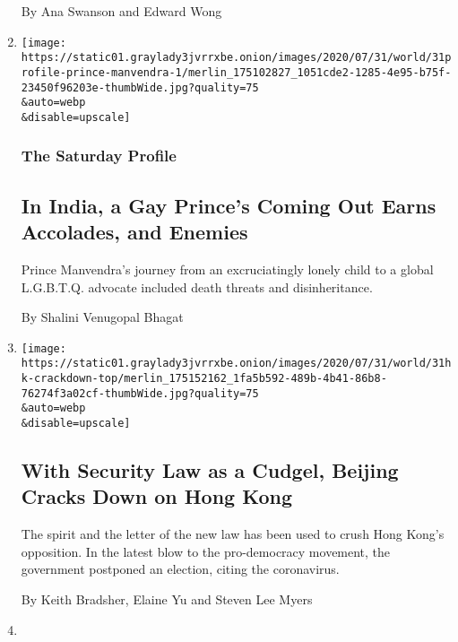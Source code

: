 \begin{enumerate}
  By Ana Swanson and Edward Wong
\item
  \href{/2020/07/31/world/asia/india-prince-manvendra-gay-rights.html}{}

  \texttt{[image: https://static01.graylady3jvrrxbe.onion/images/2020/07/31/world/31profile-prince-manvendra-1/merlin\_175102827\_1051cde2-1285-4e95-b75f-23450f96203e-thumbWide.jpg?quality=75\\\&auto=webp\\\&disable=upscale]}

  \hypertarget{the-saturday-profile}{%
  \subsubsection{The Saturday Profile}\label{the-saturday-profile}}

  \hypertarget{in-india-a-gay-princes-coming-out-earns-accolades-and-enemies}{%
  \subsection{In India, a Gay Prince's Coming Out Earns Accolades, and
  Enemies}\label{in-india-a-gay-princes-coming-out-earns-accolades-and-enemies}}

  Prince Manvendra's journey from an excruciatingly lonely child to a
  global L.G.B.T.Q. advocate included death threats and disinheritance.

  By Shalini Venugopal Bhagat
\item
  \href{/2020/07/31/world/asia/hong-kong-election-national-security-law.html}{}

  \texttt{[image: https://static01.graylady3jvrrxbe.onion/images/2020/07/31/world/31hk-crackdown-top/merlin\_175152162\_1fa5b592-489b-4b41-86b8-76274f3a02cf-thumbWide.jpg?quality=75\\\&auto=webp\\\&disable=upscale]}

  \hypertarget{with-security-law-as-a-cudgel-beijing-cracks-down-on-hong-kong}{%
  \subsection{With Security Law as a Cudgel, Beijing Cracks Down on Hong
  Kong}\label{with-security-law-as-a-cudgel-beijing-cracks-down-on-hong-kong}}

  The spirit and the letter of the new law has been used to crush Hong
  Kong's opposition. In the latest blow to the pro-democracy movement,
  the government postponed an election, citing the coronavirus.

  By Keith Bradsher, Elaine Yu and Steven Lee Myers
\item
  \href{/2020/07/31/world/asia/hong-kong-election-delayed.html}{}


\end{enumerate}

